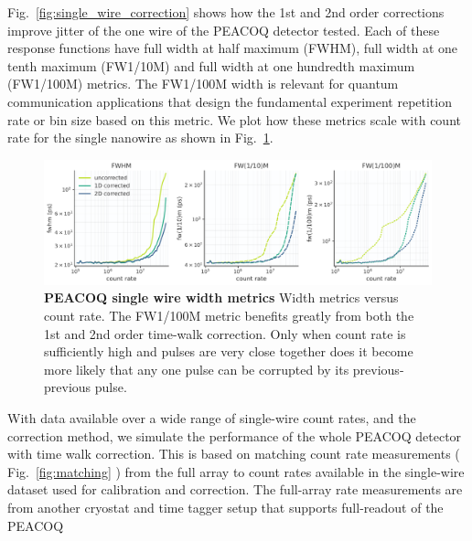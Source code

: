 \documentclass[11pt]{caltech_thesis} %
\begin{document}
Fig.~\ref{fig:single_wire_correction} shows how the 1st and 2nd order corrections improve jitter of the one wire of the PEACOQ detector tested. Each of these response functions have full width at half maximum (FWHM), full width at one tenth maximum (FW1/10M) and full width at one hundredth maximum (FW1/100M) metrics. The FW1/100M width is relevant for quantum communication applications that design the fundamental experiment repetition rate or bin size based on this metric. We plot how these metrics scale with count rate for the single nanowire as shown in Fig.~\ref{fig:single_wire_width_metrics}.

\hypertarget{fig:single_wire_width_metrics}{%
\begin{figure}
\centering
\includegraphics[width=1\textwidth,height=\textheight]{./chapter_03/figs/width_metrics_single_wire_light.pdf}
\caption[{PEACOQ single wire width metrics}]{\textbf{PEACOQ single wire width metrics} Width metrics versus count rate. The FW1/100M metric benefits greatly from both the 1st and 2nd order time-walk correction. Only when count rate is sufficiently high and pulses are very close together does it become more likely that any one pulse can be corrupted by its previous-previous pulse.}
\label{fig:single_wire_width_metrics}
\end{figure}
}

With data available over a wide range of single-wire count rates, and the correction method, we simulate the performance of the whole PEACOQ detector with time walk correction. This is based on matching count rate measurements ( Fig.~\ref{fig:matching} ) from the full array to count rates available in the single-wire dataset used for calibration and correction. The full-array rate measurements are from another cryostat and time tagger setup that supports full-readout of the PEACOQ
\end{document}
